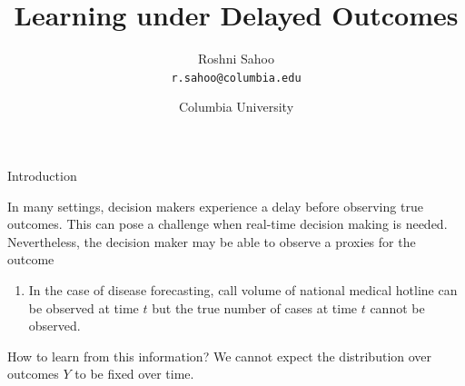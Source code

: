 \documentclass{article}
\author{Roshni Sahoo\\
  \texttt{r.sahoo@columbia.edu}
  }
\title{Learning under Delayed Outcomes}
\date{Columbia University}
\theoremstyle{definition}
\theoremstyle{plain}
\theoremstyle{remark}
\begin{document}
\maketitle

\begin{section}{Introduction}

In many settings, decision makers experience a delay before observing true outcomes. This can pose a challenge when real-time decision making is needed. Nevertheless, the decision maker may be able to observe a proxies for the outcome 

\begin{enumerate}
  \item In the case of disease forecasting, call volume of national medical hotline can be observed at time $t$ but the true number of cases at time $t$ cannot be observed.
\end{enumerate}

How to learn from this information? We cannot expect the distribution over outcomes $Y$ to be fixed over time. 




\end{section}
\end{document}
